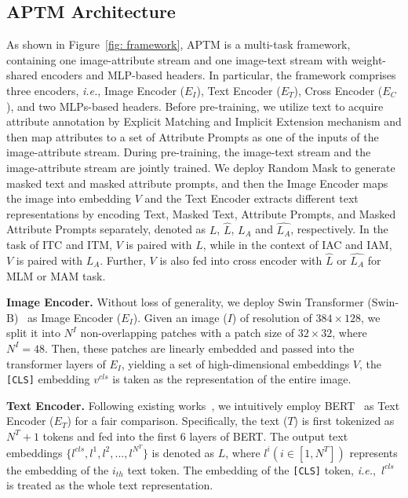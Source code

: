 \documentclass[sigconf]{acmart}
\def\ie{\emph{i.e.}}
\begin{document}
\subsection{APTM Architecture} 
As shown in Figure~\ref{fig: framework}, APTM is a multi-task framework, containing one image-attribute stream and one image-text stream with weight-shared encoders and MLP-based headers. 
In particular, the framework comprises three encoders, \ie, Image Encoder ($E_I$), Text Encoder ($E_T$), Cross Encoder ($E_C$), and two MLPs-based headers.  
Before pre-training, we utilize text to acquire attribute annotation by Explicit Matching and Implicit Extension mechanism and then map attributes to a set of Attribute Prompts as one of the inputs of the image-attribute stream. 
During pre-training, the image-text stream and the image-attribute stream are jointly trained. We deploy Random Mask to generate masked text and masked attribute prompts, and then the Image Encoder maps the image into embedding $V$ and the Text Encoder extracts different text representations by encoding Text, Masked Text, Attribute Prompts, and Masked Attribute Prompts separately, denoted as $L$, $\hat{L}$, $L_A$ and $\hat{L_A}$, respectively. 
In the task of ITC and ITM, $V$ is paired with $L$, while in the context of IAC and IAM, $V$ is paired with $L_A$. Further, $V$ is also fed into cross encoder with $\hat{L}$ or $\hat{L_A}$ for MLM or MAM task.


\noindent\textbf{Image Encoder.} 
Without loss of generality, we deploy Swin Transformer (Swin-B)~\cite{liu2021swintransformer} as Image Encoder ($E_I$).
Given an image ($I$) of resolution of $384 \times 128$, we split it into $N^I$ non-overlapping patches with a patch size of $32 \times 32$, where $N^I = 48$. 
Then, these patches are linearly embedded and passed into the transformer layers of $E_I$, yielding a set of high-dimensional embeddings $V$, the \texttt{[CLS]} embedding $v^{cls}$ is taken as the representation of the entire image.


\noindent\textbf{Text Encoder.}
Following existing works~\cite{shu2023see}, we intuitively employ BERT~\cite{kenton2019bert} as Text Encoder ($E_T$) for a fair comparison. Specifically, the text ($T$) is first tokenized as ${N^T + 1}$ tokens and fed into the first 6 layers of BERT. The output text embeddings $\{l^{cls}, l^1, l^2, ..., l^{N^T}\}$ is denoted as $L$, where ${l^i (i \in [1, N^T])}$ represents the embedding of the ${i_{th}}$ text token. The embedding of the \texttt{[CLS]} token, \ie,~${l^{cls}}$ is treated as the whole text representation.
\end{document}
